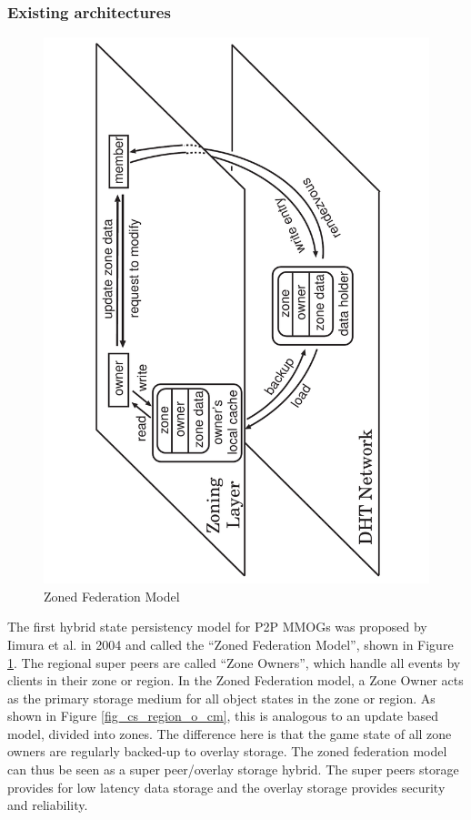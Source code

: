 \documentclass[10pt,a4paper,journal,cspaper,compsoc]{IEEEtran}
\begin{document}
\subsubsection{Existing architectures}

\begin{figure}[htbp]
 \centering
 \includegraphics[clip=true, viewport=2cm 0cm 19cm 30cm, angle=-90, width=\columnwidth]{zoned_federation_model}
 \caption{Zoned Federation Model \cite{zoned_federation}}
 \label{fig_zoned_federation_model}
\end{figure}
%
The first hybrid state persistency model for P2P MMOGs was proposed by Iimura et al. in 2004 \cite{zoned_federation} and called the ``Zoned
Federation Model'', shown in Figure \ref{fig_zoned_federation_model}. The regional super peers are called ``Zone Owners'', which handle all events by
clients in their zone or region. In the Zoned Federation model, a Zone Owner acts as the primary storage medium for all object states in the zone or
region. As shown in Figure \ref{fig_cs_region_o_cm}, this is analogous to an update based model, divided into zones. The difference here is that the
game state of all zone owners are regularly backed-up to overlay storage. The zoned federation model can thus be seen as a super peer/overlay storage
hybrid. The super peers storage provides for low latency data storage and the overlay storage provides security and reliability.
\end{document}
